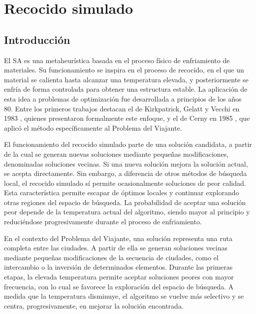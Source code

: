 \newpage

\section{Recocido simulado}
\label{sec:sa}

\subsection{Introducción}
\label{subsec:sa_intro}

El \ac{SA} es una metaheurística basada en el proceso físico de enfriamiento de materiales. Su funcionamiento se inspira en
el proceso de recocido, en el que un material se calienta hasta alcanzar una temperatura elevada, y posteriormente se enfría
de forma controlada para obtener una estructura estable. La aplicación de esta idea a problemas de optimización fue desarrollada
a principios de los años 80. Entre los primeros trabajos destacan el de Kirkpatrick, Gelatt y Vecchi en 1983 
\cite{kirkpatrick1983}, quienes presentaron formalmente este enfoque, y el de Cerny en 1985 \cite{cerny1985}, que aplicó el 
método específicamente al Problema del Viajante.

El funcionamiento del recocido simulado parte de una solución candidata, a partir de la cual se generan nuevas soluciones
mediante pequeñas modificaciones, denominadas soluciones vecinas. Si una nueva solución mejora la solución actual, se acepta
directamente. Sin embargo, a diferencia de otros métodos de búsqueda local, el recocido simulado sí permite ocasionalmente
soluciones de peor calidad. Esta característica permite escapar de óptimos locales y continuar explorando otras regiones del 
espacio de búsqueda. La probabilidad de aceptar una solución peor depende de la temperatura actual del algoritmo, siendo mayor
al principio y reduciéndose progresivamente durante el proceso de enfriamiento.

En el contexto del Problema del Viajante, una solución representa una ruta completa entre las ciudades. A partir de ella
se generan soluciones vecinas mediante pequeñas modificaciones de la secuencia de ciudades, como el intercambio o la inversión
de determinados elementos. Durante las primeras etapas, la elevada temperatura permite aceptar soluciones peores con mayor
frecuencia, con lo cual se favorece la exploración del espacio de búsqueda. A medida que la temperatura disminuye, el algoritmo
se vuelve más selectivo y se centra, progresivamente, en mejorar la solución encontrada.

